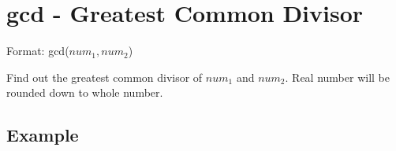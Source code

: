 
%

\section{gcd - Greatest Common Divisor\label{sect:gcd}}

Format: gcd($num_1,num_2$)

Find out the greatest common divisor of $num_1$ and $num_2$. Real number will be rounded down to whole number.


\subsection*{Example}


%

